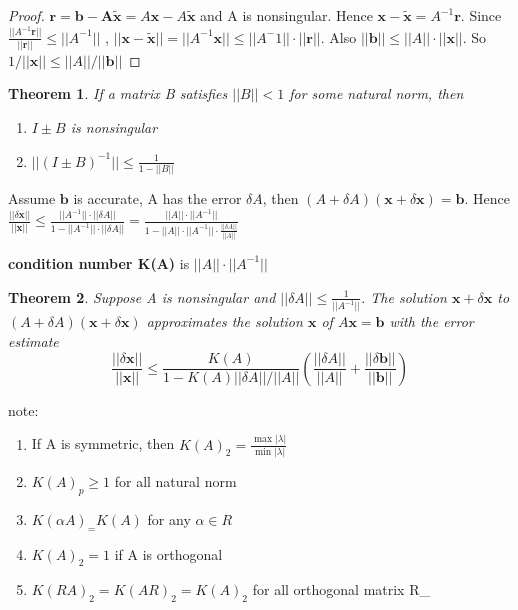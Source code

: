 \documentclass[11pt]{article}
\newtheorem{theorem}{Theorem}[section]
\newcommand{\bl}[1] {\boldsymbol{#1}}
\begin{document}
\begin{proof}
$\bl{r=b-A\tilde{x}}=A\bl{x}-A\tilde{\bl{x}}$ and A is nonsingular. Hence 
$\bl{x-\tilde{x}}=A^{-1}\bl{r}$. Since $\frac{||A^{-1}\bl{r}||}{||\bl{r}||}\le||A^{-1}||$
, $||\bl{x-\tilde{x}}||=||A^{-1}\bl{x}||\le||A^-1||\cdot||\bl{r}||$. Also
$||\bl{b}||\le||A||\cdot||\bl{x}||$. So $1/||\bl{x}||\le||A||/||\bl{b}||$
\end{proof}

\begin{theorem}
If a matrix B satisfies $||B||<1$ for some natural norm, then
\begin{enumerate}
\item $I\pm B$ is nonsingular
\item $||(I\pm B)^{-1}||\le \frac{1}{1-||B||}$
\end{enumerate}
\end{theorem}

Assume \(\bl{b}\) is accurate, A has the error \(\delta A\), then
\((A+\delta A)(\bl{x}+\delta\bl{x})=\bl{b}\). Hence
\(\frac{||\delta\bl{x}||}{||\bl{x}||}\le \frac{||A^{-1}||\cdot||\delta
   A||}{1-||A^{-1}||\cdot||\delta A||}=\frac{||A||\cdot||A^{-1}||}{1
   -||A||\cdot||A^{-1}||\cdot \frac{||\delta A||}{||A||}}\)

\textbf{condition number K(A)} is \(||A||\cdot||A^{-1}||\)

\begin{theorem}
Suppose A is nonsingular and $||\delta A||\le \frac{1}{||A^{-1}||}$. The solution
$\bl{x}+\delta\bl{x}$ to $(A+\delta A)(\bl{x}+\delta\bl{x})$ approximates the solution
$\bl{x}$ of $A\bl{x}=\bl{b}$ with the error estimate
\begin{equation*}
\frac{||\delta\bl{x}||}{||\bl{x}||}\le \frac{K(A)}{1-K(A)||\delta A||/||A||}
(\frac{||\delta A||}{||A||}+ \frac{||\delta\bl{b}||}{||\bl{b}||})
\end{equation*}
\end{theorem}

note:
\begin{enumerate}
\item If A is symmetric, then \(K(A)_2= \frac{\max|\lambda|}{\min|\lambda|}\)
\item \(K(A)_p\ge1\) for all natural norm
\item \(K(\alpha A)_=K(A)\) for any \(\alpha\in R\)
\item \(K(A)_2=1\) if A is orthogonal
\item \(K(RA)_2=K(AR)_2=K(A)_2\) for all orthogonal matrix R\_
\end{enumerate}
\end{document}
